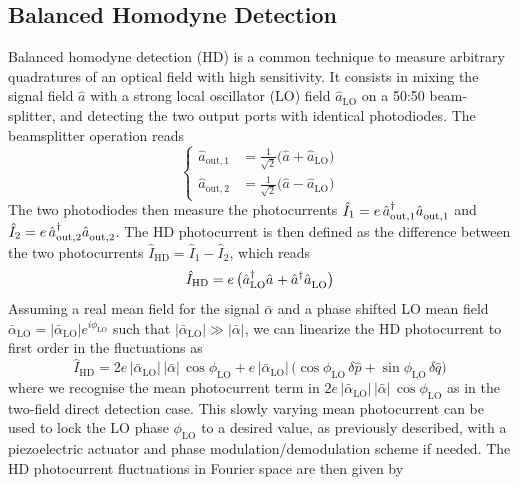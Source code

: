 \subsection{Balanced Homodyne Detection}
Balanced homodyne detection (HD) is a common technique to measure arbitrary quadratures of an optical field with high sensitivity. It consists in mixing the signal field $\hat a$ with a strong local oscillator (LO) field $\hat a_{\mathrm{LO}}$ on a 50:50 beam-splitter, and detecting the two output ports with identical photodiodes. The beamsplitter operation reads
\begin{equation}
  \left\{
  \begin{split}
    \hat a_{\mathrm{out,1}} &= \frac{1}{\sqrt{2}} \big( \hat a + \hat a_{\mathrm{LO}} \big) \\
    \hat a_{\mathrm{out,2}} &= \frac{1}{\sqrt{2}} \big( \hat a - \hat a_{\mathrm{LO}} \big)
  \end{split}
  \right.
\end{equation}
The two photodiodes then measure the photocurrents $\hat I_1 = e \, \hat a_{\mathrm{out,1}}^{\dagger}\hat a_{\mathrm{out,1}}^{\vphantom{\dagger}}$ and $\hat I_2 = e \, \hat a_{\mathrm{out,2}}^{\dagger}\hat a_{\mathrm{out,2}}^{\vphantom{\dagger}}$. The HD photocurrent is then defined as the difference between the two photocurrents $\hat I_{\mathrm{HD}} = \hat I_1 - \hat I_2$, which reads
\begin{equation}
  \hat I_{\mathrm{HD}} = e \, \big( \hat a_{\mathrm{LO}}^{\dagger} \hat a^{\vphantom{\dagger}} + \hat a^{\dagger} \hat a_{\mathrm{LO}}^{\vphantom{\dagger}} \big)
\end{equation}
Assuming a real mean field for the signal $\bar \alpha$ and a phase shifted LO mean field $\bar \alpha_{\mathrm{LO}} = |\bar \alpha_{\mathrm{LO}}| e^{i \phi_{\mathrm{LO}}}$ such that $|\bar \alpha_{\mathrm{LO}} |\gg |\bar \alpha|$, we can linearize the HD photocurrent to first order in the fluctuations as
\begin{equation}
  \hat I_{\mathrm{HD}} = 2 e \, |\bar \alpha_{\mathrm{LO}}| \, | \bar \alpha | \, \cos \phi_{\mathrm{LO}} + e \, |\bar \alpha_{\mathrm{LO}}| \, \big( \cos \phi_{\mathrm{LO}} \, \delta \hat p + \sin \phi_{\mathrm{LO}} \, \delta \hat q \big)
\end{equation}
where we recognise the mean photocurrent term in $2 e \, |\bar \alpha_{\mathrm{LO}}| \, | \bar \alpha | \, \cos \phi_{\mathrm{LO}}$ as in the two-field direct detection case. This slowly varying mean photocurrent can be used to lock the LO phase $\phi_{\mathrm{LO}}$ to a desired value, as previously described, with a piezoelectric actuator and phase modulation/demodulation scheme if needed. The HD photocurrent fluctuations in Fourier space are then given by
